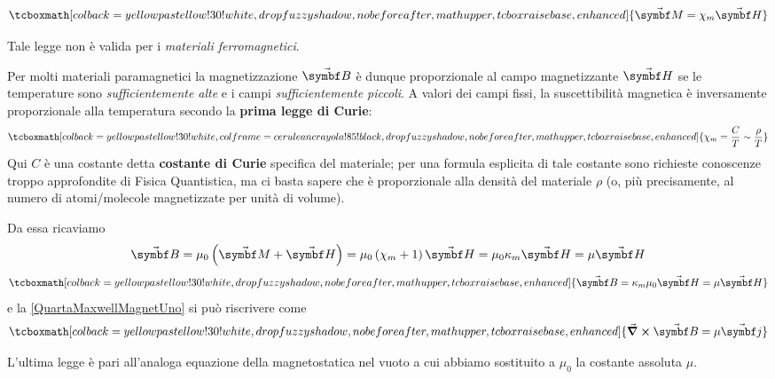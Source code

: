 \begin{equation}
		\tcboxmath[colback=yellowpastellow!30!white,drop fuzzy shadow, nobeforeafter, math upper, tcbox raise base, enhanced]{\vba{M}=\chi_m\vba{H}}
\end{equation}
\begin{attention}
	Tale legge non è valida per i \textit{materiali ferromagnetici}.
\end{attention}
\begin{digression}
	Per molti materiali paramagnetici la magnetizzazione $\vba{B}$ è dunque proporzionale al campo magnetizzante $\vba{H}$ se le temperature sono \textit{sufficientemente alte} e i campi \textit{sufficientemente piccoli}. A valori dei campi fissi, la suscettibilità magnetica è inversamente proporzionale alla temperatura secondo la \textbf{prima legge di Curie}:
	\begin{equation*}
		\tcboxmath[colback=yellowpastellow!30!white,colframe=ceruleancrayola!85!black,drop fuzzy shadow, nobeforeafter, math upper, tcbox raise base, enhanced]{\chi_m=\frac{C}{T}\sim\frac{\rho}{T}}
	\end{equation*}
	Qui $C$ è una costante detta \textbf{costante di Curie} specifica del materiale; per una formula esplicita di tale costante sono richieste conoscenze troppo approfondite di Fisica Quantistica, ma ci basta sapere che è proporzionale alla densità del materiale $\rho$ (o, più precisamente, al numero di atomi/molecole magnetizzate per unità di volume).
\end{digression}
\noindent Da essa ricaviamo
\begin{equation*}
	\vba{B}=\mu_0\left(\vba{M}+\vba{H}\right)=\mu_0\left(\chi_m+1\right)\vba{H}=\mu_0\kappa_m\vba{H}=\mu\vba{H}
\end{equation*}
\begin{equation}
		\tcboxmath[colback=yellowpastellow!30!white,drop fuzzy shadow, nobeforeafter, math upper, tcbox raise base, enhanced]{\vba{B}=\kappa_m\mu_0\vba{H}=\mu\vba{H}}
\end{equation}
e la \eqref{QuartaMaxwellMagnetUno} si può riscrivere come
\begin{equation}
	\tcboxmath[colback=yellowpastellow!30!white,drop fuzzy shadow, nobeforeafter, math upper, tcbox raise base, enhanced]{\curl{\vba{B}}=\mu\vba{j}}
\end{equation}
\begin{observe}
	L'ultima legge è pari all'analoga equazione della magnetostatica nel vuoto a cui abbiamo sostituito a $\mu_0$ la costante assoluta $\mu$.
\end{observe}
